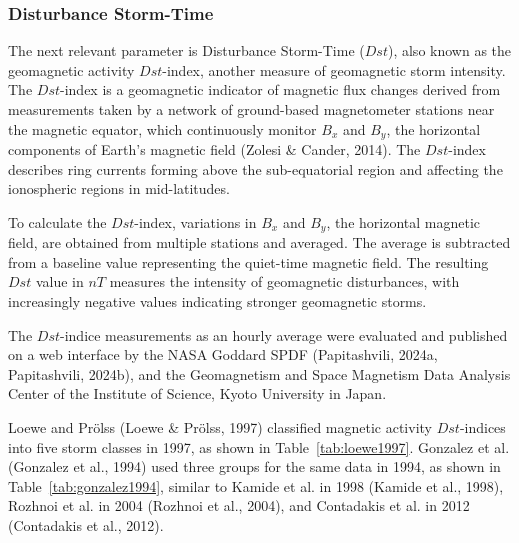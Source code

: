\documentclass[sn-mathphys-num]{sn-jnl}%
\begin{document}
\subsubsection{Disturbance Storm-Time}

The next relevant parameter is Disturbance Storm-Time ($Dst$), also known as the geomagnetic activity $Dst$-index, another measure of geomagnetic storm intensity. The $Dst$-index is a geomagnetic indicator of magnetic flux changes derived from measurements taken by a network of ground-based magnetometer stations near the magnetic equator, which continuously monitor $B_{x}$ and $B_{y}$, the horizontal components of Earth's magnetic field (Zolesi & Cander, 2014). The $Dst$-index describes ring currents forming above the sub-equatorial region and affecting the ionospheric regions in mid-latitudes.

To calculate the $Dst$-index, variations in $B_{x}$ and $B_{y}$, the horizontal magnetic field, are obtained from multiple stations and averaged. The average is subtracted from a baseline value representing the quiet-time magnetic field. The resulting $Dst$ value in $nT$ measures the intensity of geomagnetic disturbances, with increasingly negative values indicating stronger geomagnetic storms. 

The $Dst$-indice measurements as an hourly average were evaluated and published on a web interface by the NASA Goddard SPDF (Papitashvili, 2024a, Papitashvili, 2024b), and the Geomagnetism and Space Magnetism Data Analysis Center of the Institute of Science, Kyoto University in Japan.

Loewe and Prölss (Loewe & Prölss, 1997) classified magnetic activity $Dst$-indices into five storm classes in 1997, as shown in Table~\ref{tab:loewe1997}. Gonzalez et al. (Gonzalez et al., 1994) used three groups for the same data in 1994, as shown in Table~\ref{tab:gonzalez1994}, similar to Kamide et al. in 1998 (Kamide et al., 1998), Rozhnoi et al. in 2004 (Rozhnoi et al., 2004), and Contadakis et al. in 2012 (Contadakis et al., 2012).
\end{document}
